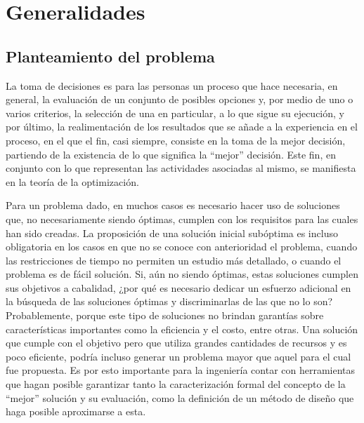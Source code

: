\chapter{Generalidades}

\section{Planteamiento del problema}

La toma de decisiones es para las personas un proceso que hace necesaria, en general, la evaluación de un conjunto de posibles opciones y, por medio de uno o varios criterios, la selección de una en particular, a lo que sigue su ejecución, y por último, la realimentación de los resultados que se añade a la experiencia en el proceso, en el que el fin, casi siempre, consiste en la toma de la mejor decisión, partiendo de la existencia de lo que significa la ``mejor'' decisión. Este fin, en conjunto con lo que representan las actividades asociadas al mismo, se manifiesta en la teoría de la optimización.

Para un problema dado, en muchos casos es necesario hacer uso de soluciones que, no necesariamente siendo óptimas, cumplen con los requisitos para las cuales han sido creadas. La proposición de una solución inicial subóptima es incluso obligatoria en los casos en que no se conoce con anterioridad el problema, cuando las restricciones de tiempo no permiten un estudio más detallado, o cuando el problema es de fácil solución. Si, aún no siendo óptimas, estas soluciones cumplen sus objetivos a cabalidad, ¿por qué es necesario dedicar un esfuerzo adicional en la búsqueda de las soluciones óptimas y discriminarlas de las que no lo son? Probablemente, porque este tipo de soluciones no brindan garantías sobre características importantes como la eficiencia y el costo, entre otras. Una solución que cumple con el objetivo pero que utiliza grandes cantidades de recursos y es poco eficiente, podría incluso generar un problema mayor que aquel para el cual fue propuesta. Es por esto importante para la ingeniería contar con herramientas que hagan posible garantizar tanto la caracterización formal del concepto de la ``mejor'' solución y su evaluación, como la definición de un método de diseño que haga posible aproximarse a esta.

